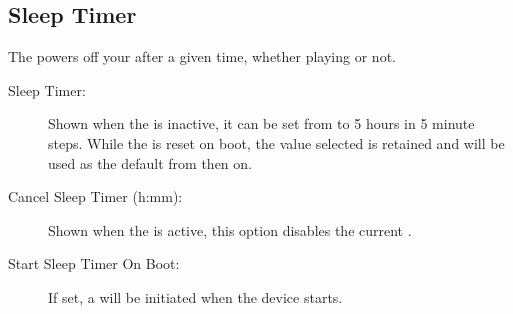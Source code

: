 \subsection{Sleep Timer}
  The  powers off your \dap{} after a given time, whether
  playing or not.
  \begin{description}
    \item[Sleep Timer:]
      Shown when the  is inactive, it can be set from
       to 5 hours in 5 minute steps.
      While the  is reset on boot, the value selected is
      retained and will be used as the default from then on.
    \item[Cancel Sleep Timer (h:mm):]
      Shown when the  is active, this option disables the
      current .
    \item[Start Sleep Timer On Boot:]
      If set, a  will be initiated when the device
      starts.
  \end{description}
